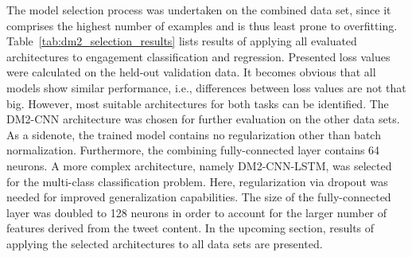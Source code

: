 The model selection process was undertaken on the combined data set, since it
comprises the highest number of examples and is thus least prone to overfitting.
Table~\ref{tab:dm2_selection_results} lists results of applying all evaluated
architectures to engagement classification and regression.
Presented loss values were calculated on the held-out validation data.
It becomes obvious that all models show similar performance, i.e., differences
between loss values are not that big.
However, most suitable architectures for both tasks can be identified.
The DM2-CNN architecture was chosen for further evaluation on the other data
sets.
As a sidenote, the trained model contains no regularization other than batch
normalization.
Furthermore, the combining fully-connected layer contains 64 neurons.
A more complex architecture, namely DM2-CNN-LSTM, was selected for the multi-class
classification problem.
Here, regularization via dropout was needed for improved generalization capabilities.
The size of the fully-connected layer was doubled to 128 neurons in order to
account for the larger number of features derived from the tweet content.
In the upcoming section, results of applying the selected architectures to
all data sets are presented.
